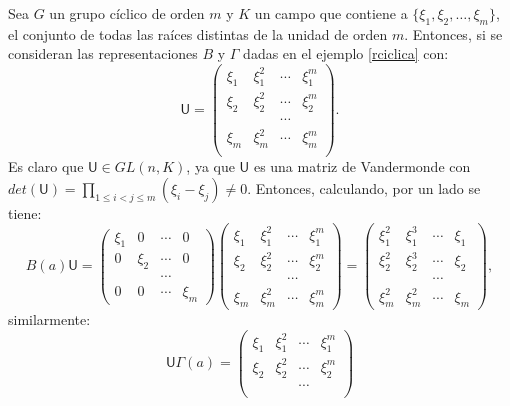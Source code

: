\begin{ejemplo}\label{ejemciclico}
Sea $G$ un grupo cíclico de orden $m$ y $K$ un campo que contiene a $\{ \xi_1, \xi_2, \dots, \xi_m \}$, el conjunto de todas las raíces distintas de la unidad de orden $m$. Entonces, si se consideran las representaciones $B$ y $\Gamma$ dadas en el ejemplo \ref{rciclica} con: 
\begin{equation*} \mathsf{U} = \begin{pmatrix}
\xi_1 & \xi_1^2 & \cdots & \xi_1^m \\
\xi_2 & \xi_2^2 & \cdots & \xi_2^m \\
 & & \cdots & \\
 \xi_m & \xi_m^2 & \cdots & \xi_m^m \\ 
\end{pmatrix}. \end{equation*}
\indent Es claro que $\mathsf{U} \in GL(n,K)$, ya que $\mathsf{U}$ es una matriz de Vandermonde con $det(\mathsf{U}) = \prod_{1 \leq i < j \leq m}(\xi_i - \xi_j) \neq 0$. Entonces, calculando, por un lado se tiene: 
\begin{equation*} B(a)\mathsf{U} = \begin{pmatrix}
\xi_1 & 0 & \cdots & 0\\
0 & \xi_2 & \cdots & 0\\
 & & \cdots & \\
 0 & 0 & \cdots & \xi_m
\end{pmatrix} \begin{pmatrix}
\xi_1 & \xi_1^2 & \cdots & \xi_1^m \\
\xi_2 & \xi_2^2 & \cdots & \xi_2^m \\
 & & \cdots & \\
 \xi_m & \xi_m^2 & \cdots & \xi_m^m
\end{pmatrix} = \begin{pmatrix}
\xi_1^2 & \xi_1^3 & \cdots & \xi_1 \\
\xi_2^2 & \xi_2^3 & \cdots & \xi_2 \\
 & & \cdots & \\
\xi_m^2 & \xi_m^2 & \cdots & \xi_m
\end{pmatrix}, \end{equation*} similarmente: \begin{equation*} 
\mathsf{U}\Gamma(a) = 
\begin{pmatrix}
\xi_1 & \xi_1^2 & \cdots & \xi_1^m \\
\xi_2 & \xi_2^2 & \cdots & \xi_2^m \\
 & & \cdots & \\

\end{pmatrix}
\end{equation*}
\end{ejemplo}
